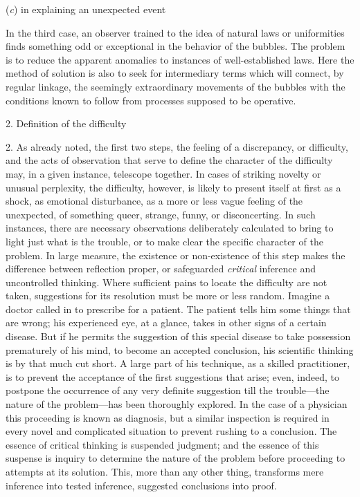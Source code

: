 \documentclass[letterpaper]{book}
\begin{document}
(\emph{c}) in explaining an unexpected event

In the third case, an observer trained to the idea of natural laws or
uniformities finds something odd or exceptional in the behavior of the
bubbles. The problem is to reduce the apparent anomalies to instances of
well-established laws. Here the method of solution is also to seek for
intermediary terms which will connect, by regular linkage, the seemingly
extraordinary movements of the bubbles with the conditions known to
follow from processes supposed to be operative.

2. Definition of the difficulty

2. As already noted, the first two steps, the feeling of a discrepancy,
or difficulty, and the acts of observation that serve to define the
character of the difficulty may, in a given instance, telescope
together. In cases of striking novelty or unusual perplexity, the
difficulty, however, is likely to present itself at first as a shock,
as
emotional disturbance, as a more or less vague feeling of the
unexpected, of something queer, strange, funny, or disconcerting. In
such instances, there are necessary observations deliberately calculated
to bring to light just what is the trouble, or to make clear the
specific character of the problem. In large measure, the existence or
non-existence of this step makes the difference between reflection
proper, or safeguarded \emph{critical} inference and uncontrolled
thinking. Where sufficient pains to locate the difficulty are not taken,
suggestions for its resolution must be more or less random. Imagine a
doctor called in to prescribe for a patient. The patient tells him some
things that are wrong; his experienced eye, at a glance, takes in other
signs of a certain disease. But if he permits the suggestion of this
special disease to take possession prematurely of his mind, to become an
accepted conclusion, his scientific thinking is by that much cut short.
A large part of his technique, as a skilled practitioner, is to prevent
the acceptance of the first suggestions that arise; even, indeed, to
postpone the occurrence of any very definite suggestion till the
trouble---the nature of the problem---has been thoroughly explored. In
the case of a physician this proceeding is known as diagnosis, but a
similar inspection is required in every novel and complicated situation
to prevent rushing to a conclusion. The essence of critical thinking is
suspended judgment; and the essence of this suspense is inquiry to
determine the nature of the problem before proceeding to attempts at its
solution. This, more than any other thing, transforms mere inference
into tested inference, suggested conclusions into proof.
\end{document}
